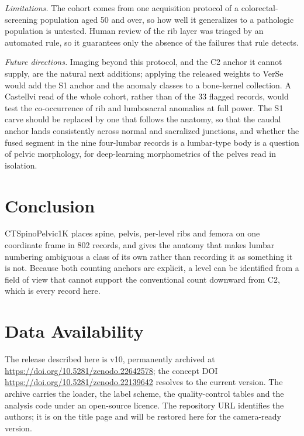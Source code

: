 \documentclass[aapm,mph,amsmath,amssymb,reprint]{revtex4-2}
\newcommand{\datasetdoi}{10.5281/zenodo.22139642}
\newcommand{\datasetversiondoi}{10.5281/zenodo.22642578}
\newcommand{\datasetversion}{v10}
\newif\ifreview \reviewtrue
\newcommand{\doiurl}[1]{\url{https://doi.org/#1}}
\begin{document}
\emph{Limitations.} The cohort comes from one acquisition protocol of a colorectal-screening population aged 50 and over, so how well it generalizes to a pathologic population is untested. Human review of the rib layer was triaged by an automated rule, so it guarantees only the absence of the failures that rule detects. 

\emph{Future directions.} Imaging beyond this protocol, and the C2 anchor it cannot supply, are the natural next additions; applying the released weights to VerSe would add the S1 anchor and the anomaly classes to a bone-kernel collection. A Castellvi read of the whole cohort, rather than of the 33 flagged records, would test the co-occurrence of rib and lumbosacral anomalies at full power. The S1 carve should be replaced by one that follows the anatomy, so that the caudal anchor lands consistently across normal and sacralized junctions, and whether the fused segment in the nine four-lumbar records is a lumbar-type body is a question of pelvic morphology, for deep-learning morphometrics of the pelves read in isolation.

\section{Conclusion}

CTSpinoPelvic1K places spine, pelvis, per-level ribs and femora on one coordinate frame in
802 records, and gives the anatomy that makes lumbar numbering ambiguous a class of its own
rather than recording it as something it is not. Because both counting anchors are explicit,
a level can be identified from a field of view that cannot support the conventional count
downward from C2, which is every record here.

\section*{Data Availability}
The release described here is \datasetversion{}, permanently archived at
\doiurl{\datasetversiondoi}; the concept DOI \doiurl{\datasetdoi} resolves to the
current version.
The archive carries the loader, the label scheme, the quality-control tables and the
analysis code under an open-source licence. \ifreview The repository URL identifies the authors; it
is on the title page and will be restored here for the camera-ready version.\else Code:
\url{https://github.com/OpenSpineConsortium/CTSpinoPelvic1K}; convenience mirror:
\url{https://huggingface.co/datasets/OpenSpineConsortium/CTSpinoPelvic1K}.\fi
\end{document}
